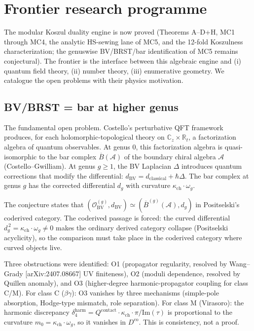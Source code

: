 \documentclass[11pt]{article}
\newcommand{\cA}{\mathcal{A}}
\newcommand{\cO}{\mathcal{O}}
\newcommand{\barB}{\overline{B}}
\newcommand{\Dg}[1]{d_{#1}}
\begin{document}
%
%
%

\section{Frontier research programme}

The modular Koszul duality engine is now proved (Theorems A--D+H,
MC1 through MC4, the analytic HS-sewing lane of MC5, and the 12-fold
Koszulness characterization; the genuswise BV/BRST/bar identification
of MC5 remains conjectural). The frontier is the
interface between this algebraic engine and (i) quantum field theory,
(ii) number theory, (iii) enumerative geometry. We catalogue the
open problems with their physics motivation.

\subsection{BV/BRST = bar at higher genus}

The fundamental open problem. Costello's perturbative
QFT framework produces, for each holomorphic-topological theory
on $\mathbb{C}_z \times \mathbb{R}_t$, a factorization algebra of
quantum observables. At genus $0$, this factorization algebra is
quasi-isomorphic to the bar complex $\barB(\cA)$ of the boundary
chiral algebra $\cA$ (Costello--Gwilliam). At genus $g \geq 1$,
the BV Laplacian $\Delta$ introduces quantum corrections that
modify the differential: $d_{\mathrm{BV}} = d_{\mathrm{classical}}
+ \hbar\Delta$. The bar complex at genus $g$ has the corrected
differential $\Dg{g}$ with curvature $\kappa_{\mathrm{ch}} \cdot \omega_g$.

The conjecture states that $(\cO_{\mathrm{BV}}^{(g)}, d_{\mathrm{BV}})
\simeq (\barB^{(g)}(\cA), \Dg{g})$ in Positselski's coderived
category. The coderived passage is forced: the curved differential
$\Dg{g}^{\,2} = \kappa_{\mathrm{ch}} \cdot \omega_g \neq 0$ makes the ordinary
derived category collapse (Positselski acyclicity), so the comparison
must take place in the coderived category where curved objects live.

Three obstructions were identified: O1 (propagator regularity,
resolved by Wang--Grady [arXiv:2407.08667] UV finiteness),
O2 (moduli dependence, resolved by Quillen anomaly), and
O3 (higher-degree harmonic-propagator coupling for class C/M).
For class C ($\beta\gamma$): O3 vanishes by three mechanisms
(simple-pole absorption, Hodge-type mismatch, role separation).
For class M (Virasoro): the harmonic discrepancy
$\delta_4^{\mathrm{harm}} = Q^{\mathrm{contact}} \cdot \kappa_{\mathrm{ch}}
\cdot \pi / \mathrm{Im}(\tau)$ is proportional to the curvature
$m_0 = \kappa_{\mathrm{ch}} \cdot \omega_g$, so it vanishes in $D^{\mathrm{co}}$.
This is consistency, not a proof.
\end{document}
